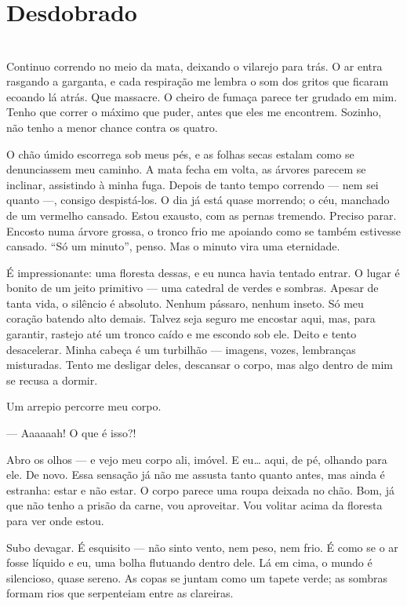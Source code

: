 \newpage

\ifdefined\useChapters
\chapter{Desdobrado}
\else
\chapter{}
\fi

Continuo correndo no meio da mata, deixando o vilarejo para trás. O ar entra rasgando a garganta, e cada respiração me lembra o som dos gritos que ficaram ecoando lá atrás. Que massacre. O cheiro de fumaça parece ter grudado em mim. Tenho que correr o máximo que puder, antes que eles me encontrem. Sozinho, não tenho a menor chance contra os quatro.

O chão úmido escorrega sob meus pés, e as folhas secas estalam como se denunciassem meu caminho. A mata fecha em volta, as árvores parecem se inclinar, assistindo à minha fuga. Depois de tanto tempo correndo — nem sei quanto —, consigo despistá-los. O dia já está quase morrendo; o céu, manchado de um vermelho cansado. Estou exausto, com as pernas tremendo. Preciso parar.  
Encosto numa árvore grossa, o tronco frio me apoiando como se também estivesse cansado. “Só um minuto”, penso. Mas o minuto vira uma eternidade.  

É impressionante: uma floresta dessas, e eu nunca havia tentado entrar. O lugar é bonito de um jeito primitivo — uma catedral de verdes e sombras. Apesar de tanta vida, o silêncio é absoluto. Nenhum pássaro, nenhum inseto. Só meu coração batendo alto demais. Talvez seja seguro me encostar aqui, mas, para garantir, rastejo até um tronco caído e me escondo sob ele.  
Deito e tento desacelerar. Minha cabeça é um turbilhão — imagens, vozes, lembranças misturadas. Tento me desligar deles, descansar o corpo, mas algo dentro de mim se recusa a dormir.

Um arrepio percorre meu corpo.  

— Aaaaaah! O que é isso?!

Abro os olhos — e vejo meu corpo ali, imóvel. E eu… aqui, de pé, olhando para ele. De novo.  
Essa sensação já não me assusta tanto quanto antes, mas ainda é estranha: estar e não estar. O corpo parece uma roupa deixada no chão. Bom, já que não tenho a prisão da carne, vou aproveitar. Vou volitar acima da floresta para ver onde estou.

Subo devagar. É esquisito — não sinto vento, nem peso, nem frio. É como se o ar fosse líquido e eu, uma bolha flutuando dentro dele. Lá em cima, o mundo é silencioso, quase sereno. As copas se juntam como um tapete verde; as sombras formam rios que serpenteiam entre as clareiras.  

